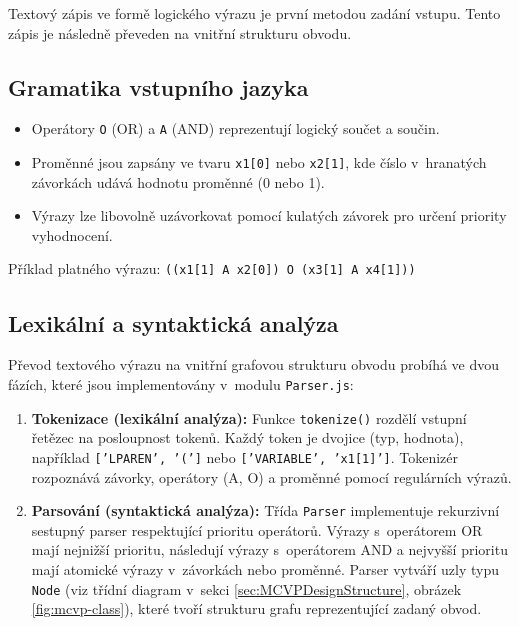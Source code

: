 Textový zápis ve formě logického výrazu je první metodou zadání vstupu. Tento zápis je následně převeden na vnitřní strukturu obvodu.

\subsection{Gramatika vstupního jazyka}
\label{sec:MCVPGrammarImpl}

\begin{itemize}
    \item Operátory \texttt{O} (OR) a \texttt{A} (AND) reprezentují logický součet a součin.
    \item Proměnné jsou zapsány ve tvaru \texttt{x1[0]} nebo \texttt{x2[1]}, kde číslo v~hranatých závorkách udává hodnotu proměnné (0 nebo 1).
    \item Výrazy lze libovolně uzávorkovat pomocí kulatých závorek pro určení priority vyhodnocení.
\end{itemize}

Příklad platného výrazu: \texttt{((x1[1] A x2[0]) O (x3[1] A x4[1]))}

\subsection{Lexikální a syntaktická analýza}
\label{sec:MCVPLexerImpl}

Převod textového výrazu na vnitřní grafovou strukturu obvodu probíhá ve dvou fázích, které jsou implementovány v~modulu \texttt{Parser.js}:

\begin{enumerate}
    \item \textbf{Tokenizace (lexikální analýza):} Funkce \texttt{tokenize()} rozdělí vstupní řetězec na posloupnost tokenů. Každý token je dvojice (typ, hodnota), například \texttt{['LPAREN', '(']} nebo \texttt{['VARIABLE', 'x1[1]']}. Tokenizér rozpoznává závorky, operátory (A, O) a proměnné pomocí regulárních výrazů.
    
    \item \textbf{Parsování (syntaktická analýza):} Třída \texttt{Parser} implementuje rekurzivní sestupný parser respektující prioritu operátorů. Výrazy s~operátorem OR mají nejnižší prioritu, následují výrazy s~operátorem AND a nejvyšší prioritu mají atomické výrazy v~závorkách nebo proměnné. Parser vytváří uzly typu \texttt{Node} (viz třídní diagram v~sekci \ref{sec:MCVPDesignStructure}, obrázek \ref{fig:mcvp-class}), které tvoří strukturu grafu reprezentující zadaný obvod.
\end{enumerate}

